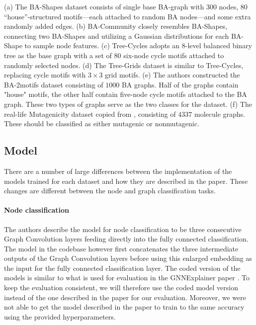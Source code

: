(a) The BA-Shapes dataset consists of single base BA-graph with 300 nodes, 80 “house”-structured motifs---each attached to random BA nodes---and some extra randomly added edges. (b) BA-Community closely resembles BA-Shapes, connecting two BA-Shapes and utilizing a Gaussian distributions for each BA-Shape to sample node features. (c) Tree-Cycles adopts an $8$-level balanced binary tree as the base graph with a set of $80$ six-node cycle motifs attached to randomly selected nodes. (d) The Tree-Grids dataset is similar to Tree-Cycles, replacing cycle motifs with $3\times 3$ grid motifs. (e) The authors constructed the BA-2motifs dataset consisting of $1000$ BA graphs. Half of the graphs contain "house" motifs, the other half contain five-node cycle motifs attached to the BA graph. These two types of graphs serve as the two classes for the dataset. (f) The real-life Mutagenicity dataset copied from \cite{ying2019gnnexplainer}, consisting of $4337$ molecule graphs. These should be classified as either mutagenic or nonmutagenic.

\subsection{Model}
There are a number of large differences between the implementation of the models trained for each dataset and how they are described in the paper. These changes are different between the node and graph classification tasks. 

\paragraph{Node classification}
The authors describe the model for node classification to be three consecutive Graph Convolution layers feeding directly into the fully connected classification. The model in the codebase however first concatenates the three intermediate outputs of the Graph Convolution layers before using this enlarged embedding as the input for the fully connected classification layer. The coded version of the models is similar to what is used for evaluation in the GNNExplainer paper \cite{ying2019gnnexplainer}. To keep the evaluation consistent, we will therefore use the coded model version instead of the one described in the paper for our evaluation. Moreover, we were not able to get the model described in the paper to train to the same accuracy using the provided hyperparameters. 

